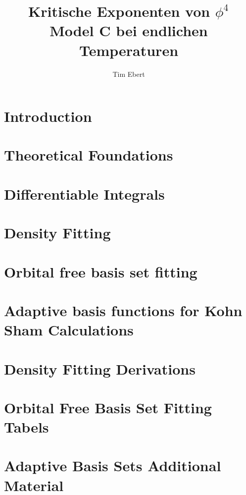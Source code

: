 \documentclass[12pt,twoside]{report}%
\author{Tim Ebert}
\title{Kritische Exponenten von $\phi^4$ Model C bei endlichen Temperaturen}
\begin{document}
\linespread{1.25}


\newpage

\tableofcontents
\chapter{Introduction} \label{chapter:introduction}

\chapter{Theoretical Foundations}

\chapter{Differentiable Integrals}

\chapter{Density Fitting} \label{chapter:densityfitting}

\chapter{Orbital free basis set fitting} \label{chapter:orbitalfreebasissetfitting}

\chapter{Adaptive basis functions for Kohn Sham Calculations} \label{chapter:adaptivebasisfunctions}

\begin{appendices}
    \chapter{Density Fitting Derivations}\label{appendix:densityfitting}
    
    \chapter{Orbital Free Basis Set Fitting Tabels}\label{appendix:orbitalfreebasissetfitting}
    
    \chapter{Adaptive Basis Sets Additional Material}\label{appendix:adaptivebasissets}
    
\end{appendices}
\printbibliography[heading=bibintoc, title={References}]
\clearpage
\newpage

\end{document}
